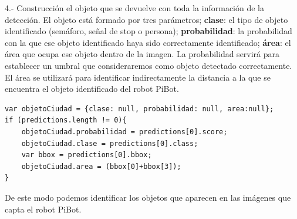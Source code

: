 \documentclass{report}
\begin{document}
4.- Construcción el objeto que se devuelve con toda la información de la detección. El objeto está formado por tres parámetros; \textbf{clase}: el tipo de objeto identificado (semáforo, señal de stop o persona); \textbf{probabilidad}: la probabilidad con la que ese objeto identificado haya sido correctamente identificado; \textbf{área}: el área que ocupa ese objeto dentro de la imagen. La probabilidad servirá para establecer un umbral que consideraremos como objeto detectado correctamente. El área se utilizará para identificar indirectamente la distancia a la que se encuentra el objeto identificado del robot PiBot.


\begin{lstlisting}[backgroundcolor = \color{light-gray},
				   belowskip = 2em,
                   xleftmargin = 2cm,
                   framexleftmargin = 1em,
                   basicstyle=\small]
var objetoCiudad = {clase: null, probabilidad: null, area:null};
if (predictions.length != 0){
	objetoCiudad.probabilidad = predictions[0].score;
	objetoCiudad.clase = predictions[0].class;
	var bbox = predictions[0].bbox;
	objetoCiudad.area = (bbox[0]+bbox[3]);
}
\end{lstlisting}

De este modo podemos identificar los objetos que aparecen en las imágenes que capta el robot PiBot.
\end{document}
